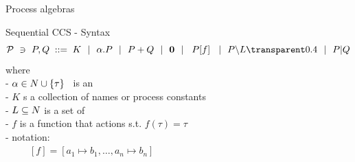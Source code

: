 \documentclass[aspectratio=169]{beamer}
\begin{document}
\begin{slide}{Process algebras}
\small

\begin{block}{Sequential CCS - Syntax}
\begin{equation*}
\mathcal{P} ~\ni~ P,Q\; ::=\; K ~~|~~ \alpha.P ~~|~~ P + Q ~~|~~ \cnil
        ~~|~~ \crn P f  ~~|~~ P\backslash L \faded{~~|~~ P|Q}
\end{equation*}
%
where
\\- $\alpha \in \Act %
    \cup \set{\tau}$~ is an 
\\- $K$ s a collection of  names or process constants
\\- $L \subseteq \Act %
    $ is a set of 
\\- $f$ is a function that  actions s.t. $f(\tau) = \tau$ %
\\- \alert{notation:}
\\~~~~~$[f] = [a_1\mapsto b_1,\ldots,a_n \mapsto b_n]$
\end{block}
\end{slide}

\end{document}
